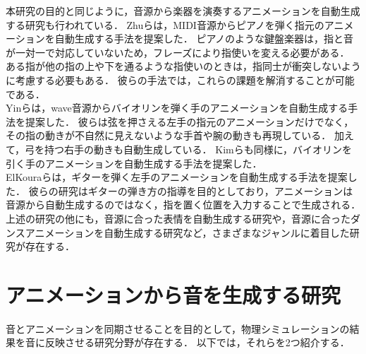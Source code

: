 %
\indent
本研究の目的と同じように，音源から楽器を演奏するアニメーションを自動生成する研究も行われている．
Zhuら\cite{piano}は，MIDI音源からピアノを弾く指元のアニメーションを自動生成する手法を提案した．
ピアノのような鍵盤楽器は，指と音が一対一で対応していないため，フレーズにより指使いを変える必要がある．
ある指が他の指の上や下を通るような指使いのときは，指同士が衝突しないように考慮する必要もある．
彼らの手法では，これらの課題を解消することが可能である．\\
\indent
Yinら\cite{violin}は，wave音源からバイオリンを弾く手のアニメーションを自動生成する手法を提案した．
彼らは弦を押さえる左手の指元のアニメーションだけでなく，その指の動きが不自然に見えないような手首や腕の動きも再現している．
加えて，弓を持つ右手の動きも自動生成している．
Kimら\cite{violin2}も同様に，バイオリンを引く手のアニメーションを自動生成する手法を提案した．\\
\indent
ElKouraら\cite{ElKoura}は，ギターを弾く左手のアニメーションを自動生成する手法を提案した．
彼らの研究はギターの弾き方の指導を目的としており，アニメーションは音源から自動生成するのではなく，指を置く位置を入力することで生成される．\\
%
\indent
上述の研究の他にも，音源に合った表情を自動生成する研究\cite{facial}\cite{DiPaola}\cite{morishima}や，音源に合ったダンスアニメーションを自動生成する研究\cite{dance2}\cite{dance1}など，さまざまなジャンルに着目した研究が存在する．

\section{アニメーションから音を生成する研究}\label{sec:generate_sound}
音とアニメーションを同期させることを目的として，物理シミュレーションの結果を音に反映させる研究分野が存在する．
以下では，それらを2つ紹介する．\\
%
